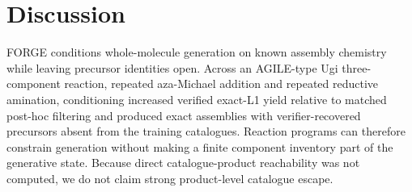 \documentclass{article}
\begin{document}
\section{Discussion}

FORGE conditions whole-molecule generation on known assembly chemistry while leaving precursor
identities open. Across an AGILE-type Ugi three-component reaction, repeated aza-Michael addition
and repeated reductive amination, conditioning increased verified exact-L1 yield relative to
matched post-hoc filtering and produced exact assemblies with verifier-recovered precursors absent
from the training catalogues. Reaction programs can therefore constrain generation without making
a finite component inventory part of the generative state. Because direct catalogue-product
reachability was not computed, we do not claim strong product-level catalogue escape.
\end{document}
